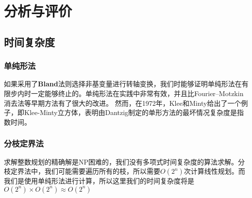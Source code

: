 \chapter{分析与评价}
\section{时间复杂度}
\subsection{单纯形法}
如果采用了\textbf{Bland}法则选择非基变量进行转轴变换，我们时能够证明单纯形法在有限步内时一定能够终止的。单纯形法在实践中非常有效，并且比Fourier–Motzkin消去法\cite{Fourier}等早期方法有了很大的改进。 然而，在1972年，Klee和Minty\cite{EXP}给出了一个例子，即Klee-Minty立方体，表明由Dantzig制定的单形方法的最坏情况复杂度是指数时间。

\subsection{分枝定界法}
求解整数规划的精确解是NP困难的，我们没有多项式时间复杂度的算法求解。分枝定界法中，我们可能需要遍历所有的枝，所以需要$O(2^n)$次计算线性规划。而我们是使用单纯形法进行计算，所以这里我们的时间复杂度将是$O(2^n)\times O(2^n) \approx O(2^n)​$

